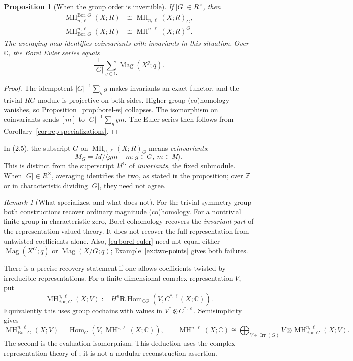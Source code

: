 \documentclass[11pt,a4paper]{article}
\newcommand{\defn}[1]{\textsl{\color{darkblue} #1}}
\numberwithin{equation}{section}
\newtheorem{proposition}[theorem]{Proposition}
\theoremstyle{definition}
\theoremstyle{remark}
\newtheorem{remark}[theorem]{Remark}
\newcommand{\Z}{\mathbb Z}
\newcommand{\C}{\mathbb C}
\newcommand{\G}{G}
\newcommand{\MH}{\operatorname{MH}}
\newcommand{\Mag}{\operatorname{Mag}}
\newcommand{\Hom}{\operatorname{Hom}}
\newcommand{\RHom}{\mathbf{R}\!\operatorname{Hom}}
\newcommand{\Irr}{\operatorname{Irr}}
\newcommand{\Bor}{\mathrm{Bor}}
\begin{document}
\begin{proposition}[When the group order is invertible]
\label{prop:averaging}
 If $|\G|\in R^\times$, then
 \begin{align}
 \MH^{\Bor,\G}_{n,\ell}(X;R)&\cong\MH_{n,\ell}(X;R)_\G,\\
 \MH^{n,\ell}_{\Bor,\G}(X;R)&\cong\MH^{n,\ell}(X;R)^\G.
 \end{align}
 The averaging map identifies coinvariants with invariants in this
 situation.  Over $\C$, the Borel Euler series equals
 \begin{equation}\label{eq:borel-euler}
 \frac1{|\G|}\sum_{g\in\G}\Mag(X^g;q).
 \end{equation}
\end{proposition}
\begin{proof}
The idempotent $|\G|^{-1}\sum_g g$ makes invariants an exact functor,
and the trivial $R\G$-module is projective on both sides.  Higher group
(co)homology vanishes, so Proposition~\ref{prop:borel-ss} collapses.
The isomorphism on coinvariants sends $[m]$ to
$|\G|^{-1}\sum_g gm$.  The Euler series then follows from
Corollary~\ref{cor:rep-specializations}.
\end{proof}

In (2.5), the subscript $\G$ on $\MH_{n,\ell}(X;R)_\G$ means
\defn{coinvariants}:
\[
 M_\G=M/\langle gm-m:g\in\G,\ m\in M\rangle.
\]
This is distinct from the superscript $M^\G$ of \defn{invariants},
the fixed submodule.  When $|\G|\in R^\times$, averaging identifies
the two, as stated in the proposition; over $\Z$ or in characteristic
dividing $|\G|$, they need not agree.

\begin{remark}[What specializes, and what does not]
For the trivial symmetry group both constructions recover ordinary
magnitude (co)homology.  For a nontrivial finite group in characteristic
zero, Borel cohomology recovers the \emph{invariant part} of the
representation-valued theory.  It does not recover the full
representation from untwisted coefficients alone.  Also,
\eqref{eq:borel-euler} need not equal either $\Mag(X^\G;q)$ or
$\Mag(X/\G;q)$; Example~\ref{ex:two-points} gives both failures.
\end{remark}

There is a precise recovery statement if one allows coefficients
twisted by irreducible representations.  For a finite-dimensional
complex representation $V$, put
\[
 \MH^{n,\ell}_{\Bor,\G}(X;V)
 :=H^n\RHom_{\C\G}(V,C^{*,\ell}(X;\C)).
\]
Equivalently this uses group cochains with values in
$V^*\otimes C^{*,\ell}$.  Semisimplicity gives
\begin{equation}\label{eq:twisted-recovery}
 \MH^{n,\ell}_{\Bor,\G}(X;V)
 =\Hom_\G(V,\MH^{n,\ell}(X;\C)),\qquad
 \MH^{n,\ell}(X;\C)
 \cong\bigoplus_{V\in\Irr(\G)}
       V\otimes\MH^{n,\ell}_{\Bor,\G}(X;V).
\end{equation}
The second is the evaluation isomorphism.  This deduction uses the
complex representation theory of \cite[Ch.~2]{Serre}; it is not a
modular reconstruction assertion.
\end{document}
